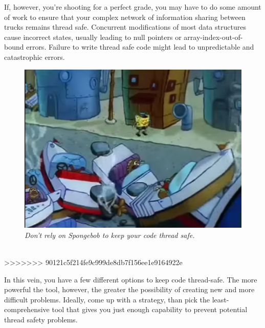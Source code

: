 \documentclass[11pt]{article}
\begin{document}
\begin{itemize}
If, however, you're shooting for a perfect grade, you may have to do some amount of work to ensure that your complex network of information sharing between trucks remains thread safe. Concurrent modifications of most data structures cause incorrect states, usually leading to null pointers or array-index-out-of-bound errors. Failure to write thread safe code might lead to unpredictable and catastrophic errors.\\
\begin{figure}[h]
\centerline{\includegraphics[scale=0.2]{collision.png}} 
\caption{\em{Don't rely on Spongebob to keep your code thread safe.}}
\end{figure}
\\
>>>>>>> 90121c5f214fe9c999de8db7f156ee1e9164922e

In this vein, you have a few different options to keep code thread-safe. The more powerful the tool, however, the greater the possibility of creating new and more difficult problems. Ideally, come up with a strategy, than pick the least-comprehensive tool that gives you just enough capability to prevent potential thread safety problems.

\end{itemize}
\end{document}
